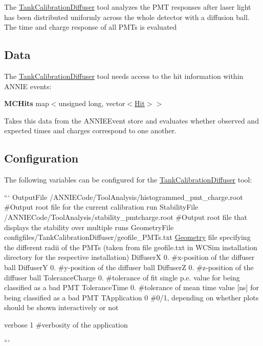 The {\ttfamily \hyperlink{classTankCalibrationDiffuser}{Tank\-Calibration\-Diffuser}} tool analyzes the P\-M\-T responses after laser light has been distributed uniformly across the whole detector with a diffusion ball. The time and charge response of all P\-M\-Ts is evaluated

\subsection*{Data}

The \hyperlink{classTankCalibrationDiffuser}{Tank\-Calibration\-Diffuser} tool needs access to the hit information within A\-N\-N\-I\-E events\-:

{\bfseries M\-C\-Hits} {\ttfamily map$<$unsigned long, vector$<$\hyperlink{classHit}{Hit}$>$$>$}
\begin{DoxyItemize}
\item Takes this data from the {\ttfamily A\-N\-N\-I\-E\-Event} store and evaluates whether observed and expected times and charges correspond to one another.
\end{DoxyItemize}

\subsection*{Configuration}

The following variables can be configured for the \hyperlink{classTankCalibrationDiffuser}{Tank\-Calibration\-Diffuser} tool\-:

``` Output\-File /\-A\-N\-N\-I\-E\-Code/\-Tool\-Analysis/histogrammed\-\_\-pmt\-\_\-charge.root \#\-Output root file for the current calibration run Stability\-File /\-A\-N\-N\-I\-E\-Code/\-Tool\-Analysis/stability\-\_\-pmtcharge.root \#\-Output root file that displays the stability over multiple runs Geometry\-File configfiles/\-Tank\-Calibration\-Diffuser/geofile\-\_\-P\-M\-Ts.\-txt \hyperlink{classGeometry}{Geometry} file specifying the different radii of the P\-M\-Ts (taken from file geofile.\-txt in W\-C\-Sim installation directory for the respective installation) Diffuser\-X 0. \#x-\/position of the diffuser ball Diffuser\-Y 0. \#y-\/position of the diffuser ball Diffuser\-Z 0. \#z-\/position of the diffuser ball Tolerance\-Charge 0. \#tolerance of fit single p.\-e. value for being classified as a bad P\-M\-T Tolerance\-Time 0. \#tolerance of mean time value \mbox{[}ns\mbox{]} for being classified as a bad P\-M\-T T\-Application 0 \#0/1, depending on whether plots should be shown interactively or not

verbose 1 \#verbosity of the application

``` 